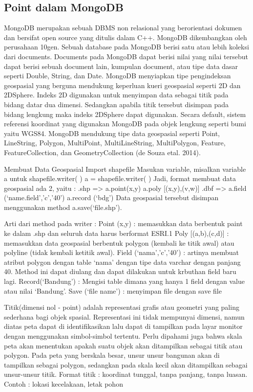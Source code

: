 \subsection{Point dalam MongoDB}
	MongoDB merupakan sebuah DBMS non relasional yang berorientasi dokumen dan bersifat open source yang ditulis dalam C++. MongoDB dikembangkan oleh perusahaan 10gen. Sebuah database pada MongoDB berisi satu atau lebih koleksi dari documents. Documents pada MongoDB dapat berisi nilai yang nilai tersebut dapat berisi sebuah document lain, kumpulan document, atau tipe data dasar seperti Double, String, dan Date. MongoDB menyiapkan tipe pengindeksan geospasial yang berguna mendukung keperluan kueri geospasial seperti 2D dan 2DSphere. Indeks 2D digunakan untuk menyimpan data sebagai titik pada bidang datar dua dimensi. Sedangkan apabila titik tersebut disimpan pada bidang lengkung maka indeks 2DSphere dapat digunakan. Secara default, sistem referensi koordinat yang digunakan MongoDB pada objek lengkung seperti bumi yaitu WGS84. MongoDB mendukung tipe data geospasial seperti Point, LineString, Polygon, MultiPoint, MultiLineString, MultiPolygon, Feature, FeatureCollection, dan GeometryCollection (de Souza etal. 2014).

Membuat Data Geospasial
Import shapefile
Masukan variable, misalkan variable a untuk shapefile.writer( )
a = shapefile.writer( )
Jadi, format membuat data geospasial ada 2, yaitu :
.shp => a.point(x,y)
a.poly [(x,y),(v,w)]
.dbf => a.field (‘name.field’,’c’,’40’)
a.record (‘bdg’)
Data geospasial tersebut disimpan menggunakan method a.save(‘file.shp’).

Arti dari method pada writer :
Point (x,y)	: memasukkan data berbentuk paint ke dalam .shp dan seluruh data harus  berformat ESRI.1
Poly [(a,b),(c,d)]	: memasukkan data geospasial berbentuk polygon (kembali ke titik    awal) atau polyline (tidak kembali ketitik awal).
Field (‘nama’,’c’,’40’)	: artinya membuat atribut polygon dengan table ‘nama’ dengan tipe data varchar dengan panjang 40. Method ini dapat diulang dan dapat dilakukan untuk krbuthan field baru lagi.
Record(‘Bandung’)	: Mengisi table dimana yang hanya 1 field dengan value atau nilai    ‘Bandung’.
Save (‘file name’)	: menyimpan file dengan save file

	Titik(dimensi nol - point) adalah representasi grafis atau geometri yang paling sederhana bagi objek spasial. Representasi ini tidak mempunyai dimensi, namun diatas peta dapat di identifikasikan lalu dapat di tampilkan pada layar monitor dengan menggunakan simbol-simbol tertentu. Perlu dipahami juga bahwa skala peta akan menentukan apakah suatu objek akan ditampilkan sebagai titik atau polygon. Pada peta yang berskala besar, unsur unsur bangunan akan di tampilkan sebagai polygon, sedangkan pada skala kecil akan ditampilkan sebagai unsur-unsur titik.
Format titik : koordinat tunggal, tanpa panjang, tanpa luasan.
Contoh : lokasi kecelakaan, letak pohon

